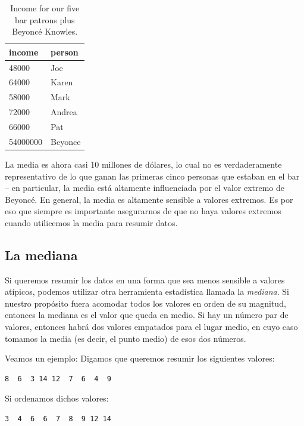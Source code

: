 \documentclass[
  12pt,
]{book}
\begin{document}
\begin{table}

\caption{\label{tab:unnamed-chunk-19}Income for our five bar patrons plus Beyoncé Knowles.}
\centering
\begin{tabular}[t]{l|l}
\hline
income & person\\
\hline
48000 & Joe\\
\hline
64000 & Karen\\
\hline
58000 & Mark\\
\hline
72000 & Andrea\\
\hline
66000 & Pat\\
\hline
54000000 & Beyonce\\
\hline
\end{tabular}
\end{table}

La media es ahora casi 10 millones de dólares, lo cual no es verdaderamente representativo de lo que ganan las primeras cinco personas que estaban en el bar -- en particular, la media está altamente influenciada por el valor extremo de Beyoncé. En general, la media es altamente sensible a valores extremos. Es por eso que siempre es importante asegurarnos de que no haya valores extremos cuando utilicemos la media para resumir datos.

\hypertarget{la-mediana}{%
\subsection{La mediana}\label{la-mediana}}

Si queremos resumir los datos en una forma que sea menos sensible a valores atípicos, podemos utilizar otra herramienta estadística llamada la \emph{mediana}. Si nuestro propósito fuera acomodar todos los valores en orden de su magnitud, entonces la mediana es el valor que queda en medio. Si hay un número par de valores, entonces habrá dos valores empatados para el lugar medio, en cuyo caso tomamos la media (es decir, el punto medio) de esos dos números.

Veamos un ejemplo: Digamos que queremos resumir los siguientes valores:

\begin{verbatim}
8  6  3 14 12  7  6  4  9
\end{verbatim}

Si ordenamos dichos valores:

\begin{verbatim}
3  4  6  6  7  8  9 12 14
\end{verbatim}
\end{document}
